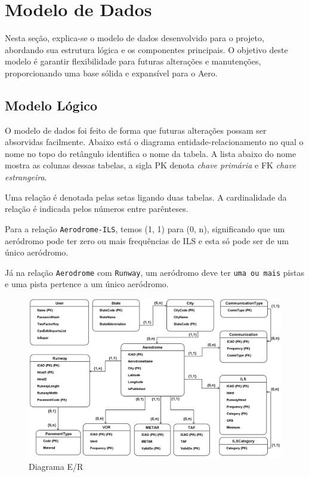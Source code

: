 \chapter{Modelo de Dados}

Nesta seção, explica-se o modelo de dados desenvolvido para o projeto, abordando 
sua estrutura lógica e os componentes principais. O objetivo deste modelo é garantir 
flexibilidade para futuras alterações e manutenções, proporcionando uma base sólida 
e expansível para o Aero.

\section{Modelo Lógico}

O modelo de dados foi feito de forma que futuras alterações possam ser absorvidas 
facilmente. Abaixo está o diagrama entidade-relacionamento no qual o nome no topo 
do retângulo identifica o nome da tabela. A lista abaixo do nome mostra as colunas 
dessas tabelas, a sigla PK denota \textit{chave primária} e FK \textit{chave estrangeira}.

Uma relação é denotada pelas setas ligando duas tabelas. A cardinalidade da relação é indicada
pelos números entre parênteses. 

Para a relação \texttt{Aerodrome-ILS}, temos (1, 1) para (0, n), significando que 
um aeródromo pode ter zero ou mais frequências de ILS e esta só pode ser de um único 
aeródromo.

Já na relação \texttt{Aerodrome} com \texttt{Runway}, um aeródromo deve ter \texttt{uma ou mais} pistas
e uma pista pertence a um único aeródromo.

\pagebreak

\begin{figure}[ht]
    \begin{center}
    \includegraphics[width=400pt]{img/ERAero.png}
    \caption{Diagrama E/R}
    \label{fig:diagrama-er}
    \end{center}
\end{figure}

